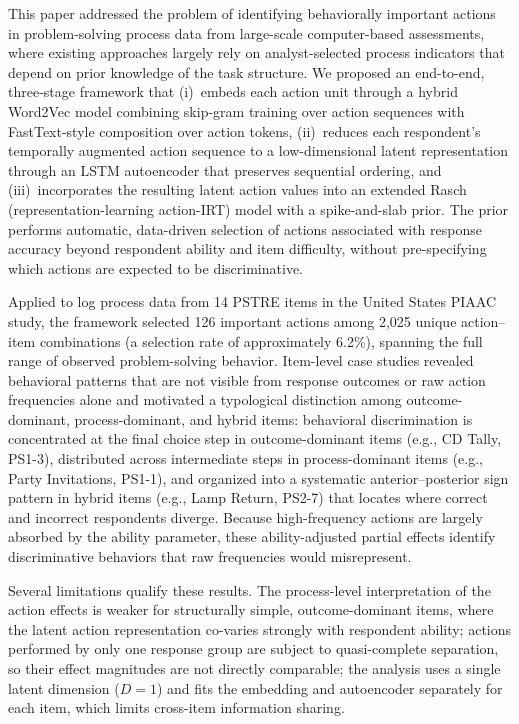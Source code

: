\documentclass[A4paper,11pt]{article}
\begin{document}
This paper addressed the problem of identifying behaviorally important actions in problem-solving process data from large-scale computer-based assessments, where existing approaches largely rely on analyst-selected process indicators that depend on prior knowledge of the task structure. We proposed an end-to-end, three-stage framework that (i)~embeds each action unit through a hybrid Word2Vec model combining skip-gram training over action sequences with FastText-style composition over action tokens, (ii)~reduces each respondent's temporally augmented action sequence to a low-dimensional latent representation through an LSTM autoencoder that preserves sequential ordering, and (iii)~incorporates the resulting latent action values into an extended Rasch (representation-learning action-IRT) model with a spike-and-slab prior. The prior performs automatic, data-driven selection of actions associated with response accuracy beyond respondent ability and item difficulty, without pre-specifying which actions are expected to be discriminative.

Applied to log process data from 14 PSTRE items in the United States PIAAC study, the framework selected 126 important actions among 2,025 unique action--item combinations (a selection rate of approximately 6.2\%), spanning the full range of observed problem-solving behavior. Item-level case studies revealed behavioral patterns that are not visible from response outcomes or raw action frequencies alone and motivated a typological distinction among outcome-dominant, process-dominant, and hybrid items: behavioral discrimination is concentrated at the final choice step in outcome-dominant items (e.g., CD Tally, PS1-3), distributed across intermediate steps in process-dominant items (e.g., Party Invitations, PS1-1), and organized into a systematic anterior--posterior sign pattern in hybrid items (e.g., Lamp Return, PS2-7) that locates where correct and incorrect respondents diverge. Because high-frequency actions are largely absorbed by the ability parameter, these ability-adjusted partial effects identify discriminative behaviors that raw frequencies would misrepresent.

Several limitations qualify these results. The process-level interpretation of the action effects is weaker for structurally simple, outcome-dominant items, where the latent action representation co-varies strongly with respondent ability; actions performed by only one response group are subject to quasi-complete separation, so their effect magnitudes are not directly comparable; the analysis uses a single latent dimension ($D=1$) and fits the embedding and autoencoder separately for each item, which limits cross-item information sharing.
\end{document}
